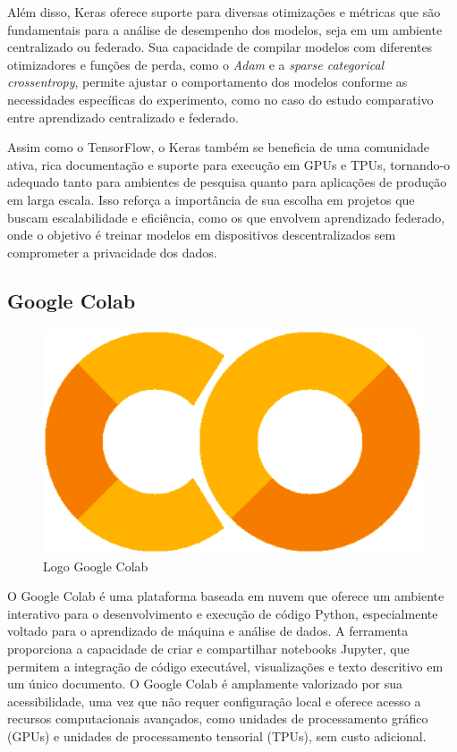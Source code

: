 Além disso, Keras oferece suporte para diversas otimizações e métricas que são fundamentais para a análise de desempenho dos modelos, seja em um ambiente centralizado ou federado. Sua capacidade de compilar modelos com diferentes otimizadores e funções de perda, como o \textit{Adam} e a \textit{sparse categorical crossentropy}, permite ajustar o comportamento dos modelos conforme as necessidades específicas do experimento, como no caso do estudo comparativo entre aprendizado centralizado e federado.

Assim como o TensorFlow, o Keras também se beneficia de uma comunidade ativa, rica documentação e suporte para execução em GPUs e TPUs, tornando-o adequado tanto para ambientes de pesquisa quanto para aplicações de produção em larga escala. Isso reforça a importância de sua escolha em projetos que buscam escalabilidade e eficiência, como os que envolvem aprendizado federado, onde o objetivo é treinar modelos em dispositivos descentralizados sem comprometer a privacidade dos dados.

\subsection{Google Colab}

\begin{figure}[ht]
	\centering
	\includegraphics[scale=0.25]{figuras/referencialTecnologico/googleColab.eps}
	\caption{Logo Google Colab}
	\label{fig:colab}
\end{figure}

O Google Colab é uma plataforma baseada em nuvem que oferece um ambiente interativo para o desenvolvimento e execução de código Python, especialmente voltado para o aprendizado de máquina e análise de dados. A ferramenta proporciona a capacidade de criar e compartilhar notebooks Jupyter, que permitem a integração de código executável, visualizações e texto descritivo em um único documento. O Google Colab é amplamente valorizado por sua acessibilidade, uma vez que não requer configuração local e oferece acesso a recursos computacionais avançados, como unidades de processamento gráfico (GPUs) e unidades de processamento tensorial (TPUs), sem custo adicional.

